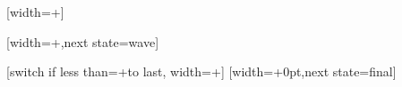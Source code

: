 %
%
%



%
%
%



%
%
%
%


%

{
  [width=+\pgfdecorationsegmentlength]
  {
    \pgfpathmoveto{\pgfqpoint{0pt}{\pgfdecorationsegmentamplitude}}
    \pgfpathlineto{\pgfqpoint{0pt}{-\pgfdecorationsegmentamplitude}}
  }
  {
    \pgfpathmoveto{\pgfqpoint{0pt}{\pgfdecorationsegmentamplitude}}
    \pgfpathlineto{\pgfqpoint{0pt}{-\pgfdecorationsegmentamplitude}}
    \pgfpathmoveto{\pgfpointdecoratedpathlast}
  }
}



%

{
  [width=+\pgfdecorationsegmentlength,next state=wave]
  {}

  [switch if less than=+\pgfdecorationsegmentlength to last,
               width=+\pgfdecorationsegmentlength]
  {
    \pgfpathmoveto{
      \pgfpointadd
      {\pgfqpoint{-\pgfdecoratedcompleteddistance}{0pt}}%
      {\pgfpointpolar{\pgfdecorationsegmentangle}{+\pgfdecoratedcompleteddistance}}}%
    \pgfpatharc{\pgfdecorationsegmentangle}{-\pgfdecorationsegmentangle}{+\pgfdecoratedcompleteddistance}%
  }
  [width=+0pt,next state=final]
  {
    \pgfpathmoveto{
      \pgfpointadd
      {\pgfqpoint{-\pgfdecoratedcompleteddistance}{0pt}}%
      {\pgfpointpolar{\pgfdecorationsegmentangle}{+\pgfdecoratedcompleteddistance}}}%
    \pgfpatharc{\pgfdecorationsegmentangle}{-\pgfdecorationsegmentangle}{+\pgfdecoratedcompleteddistance}%
  }
  {
    \pgfpathmoveto{\pgfpointdecoratedpathlast}
  }
}



